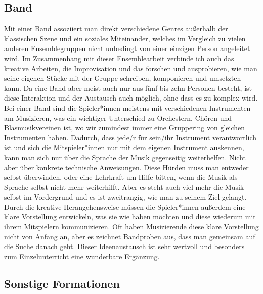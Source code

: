 \subsection{Band}

Mit einer Band assoziiert man direkt verschiedene Genres außerhalb der
klassischen Szene und ein soziales Miteinander, welches im Vergleich zu vielen
anderen Ensemblegruppen nicht unbedingt von einer einzigen Person angeleitet
wird. Im Zusammenhang mit dieser Ensemblearbeit verbinde ich auch das kreative
Arbeiten, die Improvisation und das forschen und ausprobieren, wie man seine
eigenen Stücke mit der Gruppe schreiben, komponieren und umsetzten kann. Da eine
Band aber meist auch nur aus fünf bis zehn Personen besteht, ist diese
Interaktion und der Austausch auch möglich, ohne dass es zu komplex wird. Bei
einer Band sind die Spieler*innen meistens mit verschiedenen Instrumenten am
Musizieren, was ein wichtiger Unterschied zu Orchestern, Chören und
Blasmusikvereinen ist, wo wir zumindest immer eine Gruppering von gleichen
Instrumenten haben. Dadurch, dass jede/r für sein/ihr Instrument verantwortlich
ist und sich die Mitspieler*innen nur mit dem eigenen Instrument auskennen, kann
man sich nur über die Sprache der Musik gegenseitig weiterhelfen. Nicht aber
über konkrete technische Anweisungen. Diese Hürden muss man entweder selbst
überwinden, oder eine Lehrkraft um Hilfe bitten, wenn die Musik als Sprache
selbst nicht mehr weiterhilft. Aber es steht auch viel mehr die Musik selbst im
Vordergrund und es ist zweitrangig, wie man zu seinem Ziel gelangt. Durch die
kreative Herangehensweise müssen die Spieler*innen außerdem eine klare
Vorstellung entwickeln, was sie wie haben möchten und diese wiederum mit ihrem
Mitspielern kommunizieren. Oft haben Musizierende diese klare Vorstellung nicht
von Anfang an, aber es zeichnet Bandproben aus, dass man gemeinsam auf die Suche
danach geht. Dieser Ideenaustausch ist sehr wertvoll und besonders zum
Einzelunterricht eine wunderbare Ergänzung.



\subsection{Sonstige Formationen}


